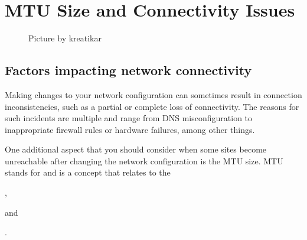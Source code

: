 \documentclass[a4paper,10pt,english,openany,oneside]{sphinxmanual}
\begin{document}
\chapter{MTU Size and Connectivity Issues}
\label{\detokenize{mtu-connectivity:mtu-size-and-connectivity-issues}}\label{\detokenize{mtu-connectivity::doc}}
\begin{figure}[H]
\centering
\capstart

\noindent{}
\caption{Picture by kreatikar \sphinxfootnotemark[12]}\label{\detokenize{mtu-connectivity:id2}}\end{figure}
%
\begin{footnotetext}[12]\sphinxAtStartFootnote
{}
%
\end{footnotetext}\ignorespaces 

\section{Factors impacting network connectivity}
\label{\detokenize{mtu-connectivity:factors-impacting-network-connectivity}}
\sphinxAtStartPar
Making changes to your network configuration can sometimes result in connection inconsistencies, such as a partial or complete loss of connectivity. The reasons for such incidents are multiple and range from DNS misconfiguration to inappropriate firewall rules or hardware failures, among other things.

\sphinxAtStartPar
One additional aspect that you should consider when some sites become unreachable after changing the network configuration is the MTU size. MTU stands for  and is a concept that relates to the %
\begin{footnote}[13]\sphinxAtStartFootnote
{}
%
\end{footnote}, %
\begin{footnote}[14]\sphinxAtStartFootnote
{}
%
\end{footnote} and %
\begin{footnote}[15]\sphinxAtStartFootnote
{}
%
\end{footnote}.
\end{document}
